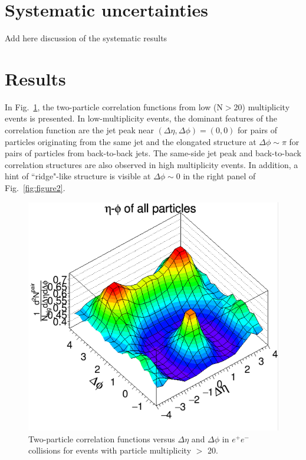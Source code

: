 \documentclass[aps,prl,twocolumn,showpacs,superscriptaddress,groupedaddress]{revtex4}  %
\begin{document}
\section{\label{sec:systematic}Systematic uncertainties}
Add here discussion of the systematic results
\section{\label{sec:results}Results}
In Fig.~\ref{fig:figure1}, the two-particle correlation functions from low (N$>$20) multiplicity events is presented. In low-multiplicity events, the dominant features of the correlation function are the jet peak near $(\Delta\eta,\Delta\phi)=(0,0)$ for pairs of particles originating from the same jet and the elongated structure at $\Delta\phi\sim\pi$ for pairs of particles from back-to-back jets. %
The same-side jet peak and back-to-back correlation structures are also observed in high multiplicity events. 
In addition, a hint of ``ridge"-like structure is visible at $\Delta\phi \sim$0 in the right panel of Fig.~\ref{fig:figure2}. 

\begin{figure}[!htb]
\begin{center}
\includegraphics[width=.45\textwidth]{figure1.png}
\caption{Two-particle correlation functions versus $\Delta\eta$ and $\Delta\phi$ in $e^{+}e^{-}$ collisions for events with particle multiplicity $>$ 20.}
\label{fig:figure1} 
\end{center}
\end{figure}
\end{document}
